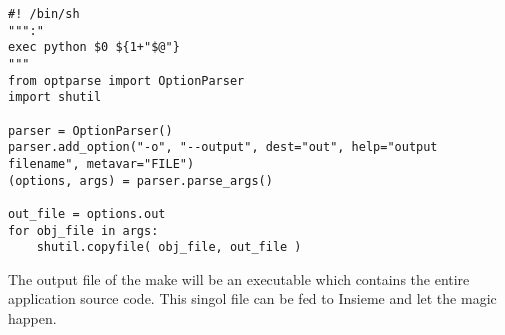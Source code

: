 \begin{lstlisting}
#! /bin/sh
""":"
exec python $0 ${1+"$@"}
"""
from optparse import OptionParser
import shutil

parser = OptionParser()
parser.add_option("-o", "--output", dest="out", help="output filename", metavar="FILE")
(options, args) = parser.parse_args()

out_file = options.out
for obj_file in args:
	shutil.copyfile( obj_file, out_file )
\end{lstlisting}

The output file of the make will be an executable which contains the entire
application source code. This singol file can be fed to Insieme and let the
magic happen.

